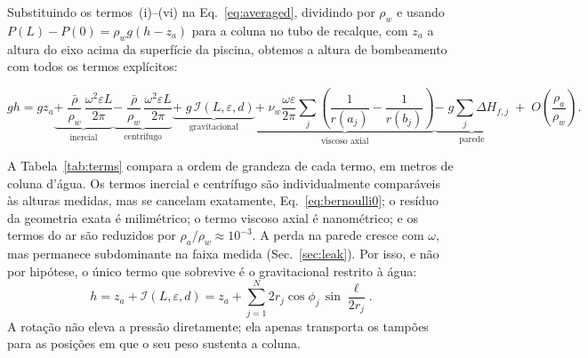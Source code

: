 \documentclass[aps,pre,twocolumn,superscriptaddress,nofootinbib,floatfix]{revtex4-2}
\begin{document}
Substituindo os termos~(i)--(vi) na Eq.~\eqref{eq:averaged}, dividindo por $\rho_w$ e usando $P(L)-P(0)=\rho_wg(h-z_a)$ para a coluna no tubo de recalque, com $z_a$ a altura do eixo acima da superfície da piscina, obtemos a altura de bombeamento com todos os termos explícitos:
\begin{widetext}
\begin{equation}
  gh = gz_a
  \underbrace{+\;\frac{\bar\rho}{\rho_w}\,\frac{\omega^2\varepsilon L}{2\pi}}_{\text{inercial}}
  \underbrace{-\;\frac{\bar\rho}{\rho_w}\,\frac{\omega^2\varepsilon L}{2\pi}}_{\text{centrífugo}}
  \underbrace{+\;g\,\mathcal I(L,\varepsilon,d)}_{\text{gravitacional}}
  \underbrace{+\;\nu_w\frac{\omega\varepsilon}{2\pi}\sum_j\left(\frac{1}{r(a_j)}-\frac{1}{r(b_j)}\right)}_{\text{viscoso axial}}
  \underbrace{-\;g\sum_j\Delta H_{f,j}}_{\text{parede}}
  \;+\;O\!\left(\frac{\rho_a}{\rho_w}\right).
  \label{eq:height_full}
\end{equation}
\end{widetext}
A Tabela~\ref{tab:terms} compara a ordem de grandeza de cada termo, em metros de coluna d'água. Os termos inercial e centrífugo são individualmente comparáveis às alturas medidas, mas se cancelam exatamente, Eq.~\eqref{eq:bernoulli0}; o resíduo da geometria exata é milimétrico; o termo viscoso axial é nanométrico; e os termos do ar são reduzidos por $\rho_a/\rho_w\approx10^{-3}$. A perda na parede cresce com $\omega$, mas permanece subdominante na faixa medida (Sec.~\ref{sec:leak}). Por isso, e não por hipótese, o único termo que sobrevive é o gravitacional restrito à água:
\begin{equation}
  h = z_a + \mathcal I(L,\varepsilon,d) = z_a + \sum_{j=1}^{N}2r_j\cos\phi_j\,\sin\frac{\ell}{2r_j}.
  \label{eq:h_phi}
\end{equation}
A rotação não eleva a pressão diretamente; ela apenas transporta os tampões para as posições em que o seu peso sustenta a coluna.
\end{document}
